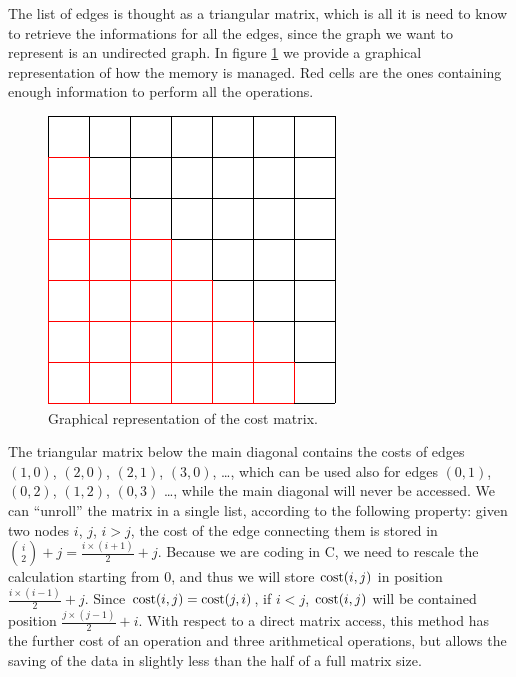 The list of edges is thought as a triangular matrix, which is all it is need to know to retrieve the informations for all the edges, since the graph we want to represent is an undirected graph. In figure \ref{fig:costmatrix} we provide a graphical representation of how the memory is managed. Red cells are the ones containing enough information to perform all the operations.

\begin{figure}[hbtp]
  \centering
  \includegraphics[width=.4\columnwidth]{images/cost_full.png}
  \caption{Graphical representation of the cost matrix.}
  \label{fig:costmatrix}
\end{figure}

The triangular matrix below the main diagonal contains the costs of edges $(1,0)$, $(2,0)$, $(2,1)$, $(3,0)$, \dots, which can be used also for edges $(0,1)$, $(0,2)$, $(1,2)$, $(0,3)$ \dots, while the main diagonal will never be accessed. We can ``unroll'' the matrix in a single list, according to the following property: given two nodes $i$, $j$, $i>j$, the cost of the edge connecting them is stored in $\binom{i}{2}+j = \frac{i \times (i+1)}{2} + j$. Because we are coding in C, we need to rescale the calculation starting from $0$, and thus we will store $\mbox{cost}(i,j)$ in position $\frac{i \times (i-1)}{2} + j$. Since $\mbox{cost}(i,j) = \mbox{cost}(j,i)$, if $i < j$, $\mbox{cost}(i,j)$ will be contained position $\frac{j \times (j-1)}{2} + i$. With respect to a direct matrix access, this method has the further cost of an  operation and three arithmetical operations, but allows the saving of the data in slightly less than the half of a full matrix size.
